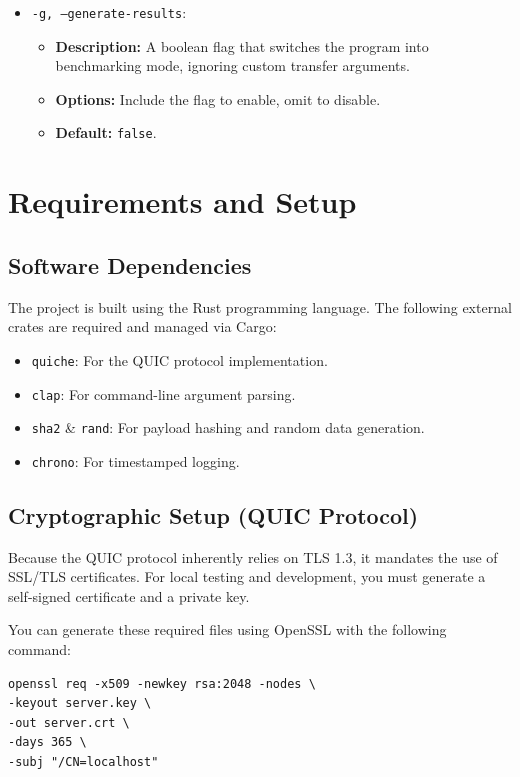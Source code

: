 \documentclass[12pt,a4paper]{article}
\begin{document}
\begin{itemize}
    \item \texttt{-g, --generate-results}:
    \begin{itemize}
        \item \textbf{Description:} A boolean flag that switches the program into benchmarking mode, ignoring custom transfer arguments.
        \item \textbf{Options:} Include the flag to enable, omit to disable.
        \item \textbf{Default:} \texttt{false}.
    \end{itemize}
\end{itemize}

\section{Requirements and Setup}

\subsection{Software Dependencies}
The project is built using the Rust programming language. The following external crates are required and managed via Cargo:
\begin{itemize}
    \item \texttt{quiche}: For the QUIC protocol implementation.
    \item \texttt{clap}: For command-line argument parsing.
    \item \texttt{sha2} \& \texttt{rand}: For payload hashing and random data generation.
    \item \texttt{chrono}: For timestamped logging.
\end{itemize}

\subsection{Cryptographic Setup (QUIC Protocol)}
Because the QUIC protocol inherently relies on TLS 1.3, it mandates the use of SSL/TLS certificates. For local testing and development, you must generate a self-signed certificate and a private key.

You can generate these required files using OpenSSL with the following command:
\begin{verbatim}
openssl req -x509 -newkey rsa:2048 -nodes \
-keyout server.key \
-out server.crt \
-days 365 \
-subj "/CN=localhost"
\end{verbatim}
\end{document}
